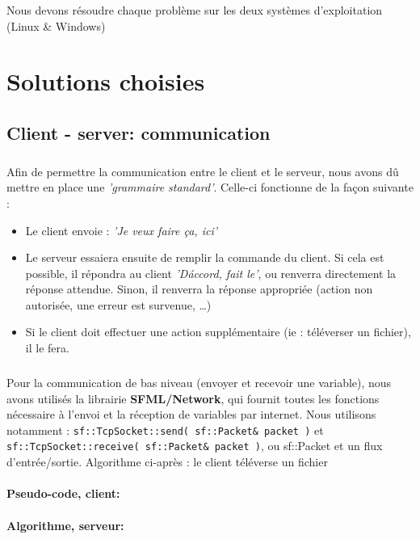 \documentclass[12pt,a4paper,twoside]{article}
\begin{document}
			Nous devons résoudre chaque problème sur les deux systèmes d'exploitation (Linux \& Windows)
	\section{Solutions choisies} %
		\subsection{Client - server: communication} %
			\subparagraph*{}
				Afin de permettre la communication entre le client et le serveur, nous avons dû mettre en place une \textit{'grammaire standard'}. Celle-ci fonctionne de la façon suivante :
				\begin{itemize}
					\item{} Le client envoie : \textit{'Je veux faire ça, ici'}
					\item{} Le serveur essaiera ensuite de remplir la commande du client. Si cela est possible, il répondra au client \textit{'D\'accord, fait le'}, ou renverra directement la réponse attendue. Sinon, il renverra la réponse appropriée (action non autorisée, une erreur est survenue, \ldots{})
					\item{} Si le client doit effectuer une action supplémentaire (ie : téléverser un fichier), il le fera.
				\end{itemize}
			\subparagraph*{}
				Pour la communication de bas niveau (envoyer et recevoir une variable), nous avons utilisés la librairie \textbf{SFML/Network}, qui fournit toutes les fonctions nécessaire à l'envoi et la réception de variables par internet. Nous utilisons notamment : \lstinline$sf::TcpSocket::send( sf::Packet& packet )$ et \lstinline$sf::TcpSocket::receive( sf::Packet& packet )$, ou sf::Packet et un flux d'entrée/sortie.
				Algorithme ci-après : le client téléverse un fichier
			\paragraph*{Pseudo-code, client:}
				
			\paragraph*{Algorithme, serveur:}
				
				
\end{document}

